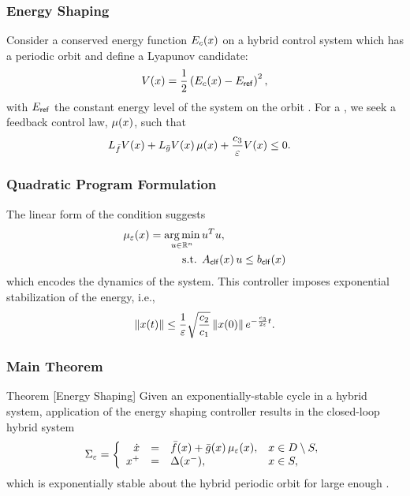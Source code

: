 \begin{frame}[t]
  \frametitle{Energy Shaping}
  Consider a conserved energy function $E_{c}(x)$ on a hybrid control system
  \HCSbar which has a periodic orbit \orbit and define a Lyapunov candidate:
  \begin{align*}
    V(x) = \frac{1}{2} \left(E_{c}(x) - E_{\mathsf{ref}}\right)^{2},
  \end{align*}
  with $E_{\mathsf{ref}}$ the constant energy level of the system on the orbit
  \orbit. For a \RESCLF, we seek a feedback control law, $\mu(x)$, such that
  \begin{align*}
    L_{{\bar {f}}} V(x) + L_{{\bar {g}}} V(x) \, \mu(x) + \frac{c_{3}}{\varepsilon} V(x) &\leq 0.
  \end{align*}
\end{frame}

\begin{frame}[t]
  \frametitle{Quadratic Program Formulation}
  The linear form of the \RESCLF condition suggests
  \begin{align*}
    \mu_{\varepsilon}(x) = \operatorname*{arg\,min}_{u \in \mathbb{R}^{n}}  \, & u^T u,\\
    \mbox{s.t. } & A_{\mathsf{clf}}(x) \, u \leq b_{\mathsf{clf}}(x)
  \end{align*}
  which encodes the dynamics of the system. This controller imposes exponential
  stabilization of the energy, i.e.,
  \begin{align*}
    \left\|x(t)\right\| \leq \frac{1}{\varepsilon}
    \sqrt{\frac{c_{2}}{c_{1}}} \left\|x(0)\right\| e^{-\frac{c_{3}}{2\varepsilon} t}.
  \end{align*}
\end{frame}

\begin{frame}[t]
  \frametitle{Main Theorem}
  \begin{block}{Theorem [Energy Shaping]}
    Given an exponentially-stable cycle in a hybrid system, application
    of the energy shaping controller results in the closed-loop hybrid system
    \begin{align*}
      \Sigma_{\varepsilon} = \left\{
        \begin{array}{r c l l}
          \dot{x} &=& {\bar {f}}(x) + {\bar {g}}(x) \, \mu_{\varepsilon}(x), & x \in D \setminus S,\\
          x^{+} &=& \Delta(x^{-}), & x \in S,
        \end{array}\right.
    \end{align*}
    which is exponentially stable about the hybrid periodic orbit \orbit for
    large enough \resclfparam.
  \end{block}
\end{frame}

